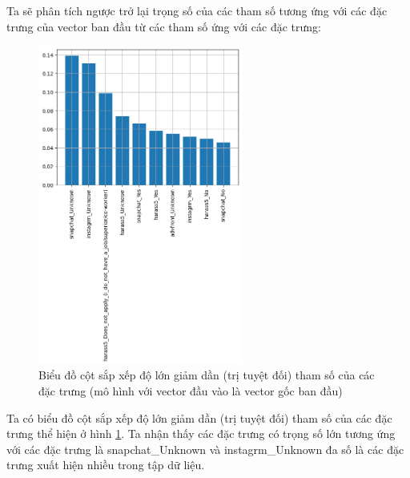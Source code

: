 \begin{enumerate}[label=(\alph*)]
    Ta sẽ phân tích ngược trở lại trọng số của các tham số tương ứng với các đặc trưng của vector ban đầu từ các tham số ứng với các đặc trưng:

    \begin{figure}[H]
        \centering
        \includegraphics[width=0.6\textwidth]{figures/Thanh/Models/Random_Forest/With_null_models_Feature_Importance_Random_Forest_original_features.png}
        \caption{Biểu đồ cột sắp xếp độ lớn giảm dần (trị tuyệt đối) tham số của các đặc trưng (mô hình với vector đầu vào là vector gốc ban đầu)}
        \label{fig:With_null_models_Feature_Importance_Random_Forest_original_features}
    \end{figure}
    
    Ta có biểu đồ cột sắp xếp độ lớn giảm dần (trị tuyệt đối) tham số của các đặc trưng thể hiện ở hình \ref{fig:With_null_models_Feature_Importance_Random_Forest_original_features}.
    Ta nhận thấy các đặc trưng có trọng số lớn tương ứng với các đặc trưng là snapchat\_Unknown và instagrm\_Unknown đa số là các đặc trưng xuất hiện nhiều trong tập dữ liệu.
\end{enumerate}
